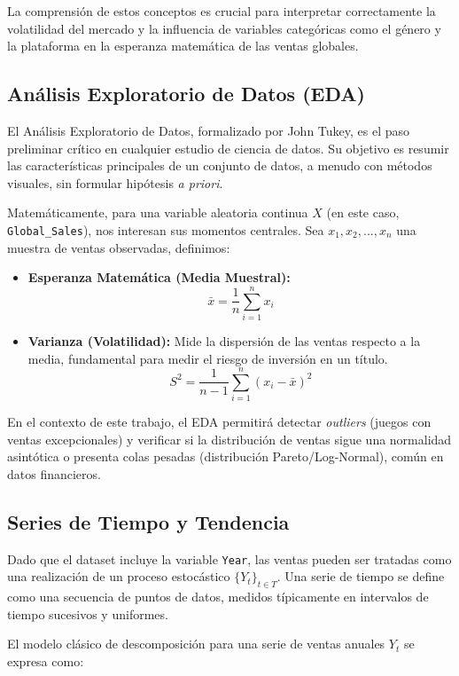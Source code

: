\documentclass[oneside,11pt]{Latex/Classes/PhDthesisPSnPDF}
\begin{document}
La comprensión de estos conceptos es crucial para interpretar
correctamente la volatilidad del mercado y la influencia de variables
categóricas como el género y la plataforma en la esperanza matemática de
las ventas globales.

\subsection{Análisis Exploratorio de Datos (EDA)}

El Análisis Exploratorio de Datos, formalizado por John Tukey, es el
paso preliminar crítico en cualquier estudio de ciencia de datos. Su
objetivo es resumir las características principales de un conjunto de
datos, a menudo con métodos visuales, sin formular hipótesis \emph{a
priori}.

Matemáticamente, para una variable aleatoria continua \(X\) (en este
caso, \texttt{Global\_Sales}), nos interesan sus momentos centrales. Sea
\(x_1, x_2, ..., x_n\) una muestra de ventas observadas, definimos:

\begin{itemize}
\item
  \textbf{Esperanza Matemática (Media Muestral):}
  \[\bar{x} = \frac{1}{n} \sum_{i=1}^{n} x_i\]
\item
  \textbf{Varianza (Volatilidad):} Mide la dispersión de las ventas
  respecto a la media, fundamental para medir el riesgo de inversión en
  un título. \[S^2 = \frac{1}{n-1} \sum_{i=1}^{n} (x_i - \bar{x})^2\]
\end{itemize}

En el contexto de este trabajo, el EDA permitirá detectar
\emph{outliers} (juegos con ventas excepcionales) y verificar si la
distribución de ventas sigue una normalidad asintótica o presenta colas
pesadas (distribución Pareto/Log-Normal), común en datos financieros.

\subsection{Series de Tiempo y Tendencia}

Dado que el dataset incluye la variable \texttt{Year}, las ventas pueden
ser tratadas como una realización de un proceso estocástico
\(\{Y_t\}_{t \in T}\). Una serie de tiempo se define como una secuencia
de puntos de datos, medidos típicamente en intervalos de tiempo
sucesivos y uniformes.

El modelo clásico de descomposición para una serie de ventas anuales
\(Y_t\) se expresa como:
\end{document}
